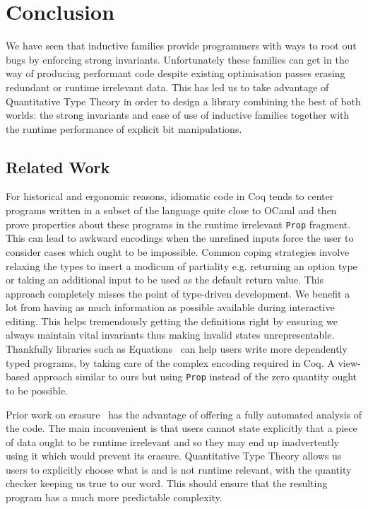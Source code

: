 \documentclass{article}
\newcommand{\coq}{Coq}
\begin{document}





\section{Conclusion}\label{sec:conclusion}

We have seen that inductive families provide programmers with ways to root out bugs
by enforcing strong invariants. Unfortunately these families can get in the way of
producing performant code despite existing optimisation passes erasing redundant
or runtime irrelevant data.
%
This has led us to take advantage of Quantitative Type Theory in order to design a library
combining the best of both worlds: the strong invariants and ease of use of inductive
families together with the runtime performance of explicit bit manipulations.

\subsection{Related Work}

For historical and ergonomic reasons, idiomatic code in \coq{} tends to center programs
written in a subset of the language quite close to OCaml and then prove properties
about these programs in the runtime irrelevant \texttt{Prop} fragment.
%
This can lead to awkward encodings when the unrefined inputs force the user to consider
cases which ought to be impossible. Common coping strategies involve relaxing the types
to insert a modicum of partiality e.g. returning an option type or taking an additional
input to be used as the default return value.
%
This approach completely misses the point of type-driven development. We benefit a lot
from having as much information as possible available during interactive editing. This
helps tremendously getting the definitions right by ensuring we always maintain vital
invariants thus making invalid states unrepresentable.
%
Thankfully libraries such as Equations~\cite{DBLP:conf/itp/Sozeau10,DBLP:journals/pacmpl/SozeauM19}
can help users write more dependently typed programs, by taking care of the complex
encoding required in \coq{}. A view-based approach similar to ours but using \texttt{Prop}
instead of the zero quantity ought to be possible.

Prior work on erasure~\cite{DBLP:journals/pacmpl/Tejiscak20} has the advantage of
offering a fully automated analysis of the code. The main inconvenient is that users
cannot state explicitly that a piece of data ought to be runtime irrelevant and so
they may end up inadvertently using it which would prevent its erasure.
%
Quantitative Type Theory allows us users to explicitly choose what is and is not
runtime relevant, with the quantity checker keeping us true to our word.
%
This should ensure that the resulting program has a much more predictable complexity.
\end{document}
